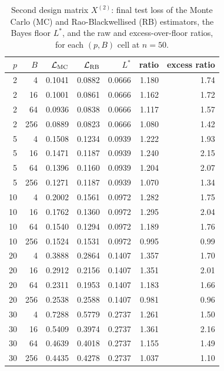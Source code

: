 \begin{table}[htbp]
  \centering
  \small
  \caption{Second design matrix $X^{(2)}$: final test loss of the Monte
  Carlo (MC) and Rao-Blackwellised (RB) estimators, the Bayes floor
  $L^{*}$, and the raw and excess-over-floor ratios, for each $(p, B)$
  cell at $n = 50$.}
  \label{tab:main-grid-X2}
  \begin{tabular}{rr rrr rr}
    \toprule
    $p$ & $B$ & $\mathcal{L}_{\mathrm{MC}}$ & $\mathcal{L}_{\mathrm{RB}}$
        & $L^{*}$ & ratio & excess ratio \\
    \midrule
    2 & 4   & 0.1041 & 0.0882 & 0.0666 & 1.180 & 1.74 \\
    2 & 16  & 0.1001 & 0.0861 & 0.0666 & 1.162 & 1.72 \\
    2 & 64  & 0.0936 & 0.0838 & 0.0666 & 1.117 & 1.57 \\
    2 & 256 & 0.0889 & 0.0823 & 0.0666 & 1.080 & 1.42 \\
    \midrule
    5 & 4   & 0.1508 & 0.1234 & 0.0939 & 1.222 & 1.93 \\
    5 & 16  & 0.1471 & 0.1187 & 0.0939 & 1.240 & 2.15 \\
    5 & 64  & 0.1396 & 0.1160 & 0.0939 & 1.204 & 2.07 \\
    5 & 256 & 0.1271 & 0.1187 & 0.0939 & 1.070 & 1.34 \\
    \midrule
    10 & 4   & 0.2002 & 0.1561 & 0.0972 & 1.282 & 1.75 \\
    10 & 16  & 0.1762 & 0.1360 & 0.0972 & 1.295 & 2.04 \\
    10 & 64  & 0.1540 & 0.1294 & 0.0972 & 1.189 & 1.76 \\
    10 & 256 & 0.1524 & 0.1531 & 0.0972 & 0.995 & 0.99 \\
    \midrule
    20 & 4   & 0.3888 & 0.2864 & 0.1407 & 1.357 & 1.70 \\
    20 & 16  & 0.2912 & 0.2156 & 0.1407 & 1.351 & 2.01 \\
    20 & 64  & 0.2311 & 0.1953 & 0.1407 & 1.183 & 1.66 \\
    20 & 256 & 0.2538 & 0.2588 & 0.1407 & 0.981 & 0.96 \\
    \midrule
    30 & 4   & 0.7288 & 0.5779 & 0.2737 & 1.261 & 1.50 \\
    30 & 16  & 0.5409 & 0.3974 & 0.2737 & 1.361 & 2.16 \\
    30 & 64  & 0.4639 & 0.4018 & 0.2737 & 1.155 & 1.49 \\
    30 & 256 & 0.4435 & 0.4278 & 0.2737 & 1.037 & 1.10 \\
    \bottomrule
  \end{tabular}
\end{table}

